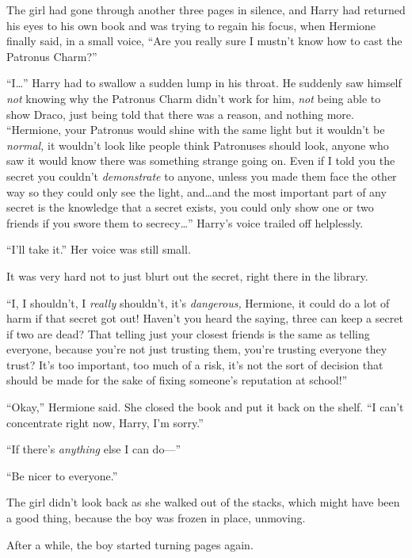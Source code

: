 The girl had gone through another three pages in silence, and Harry had returned his eyes to his own book and was trying to regain his focus, when Hermione finally said, in a small voice, “Are you really sure I mustn’t know how to cast the Patronus Charm?”

“I…” Harry had to swallow a sudden lump in his throat. He suddenly saw himself \emph{not} knowing why the Patronus Charm didn’t work for him, \emph{not} being able to show Draco, just being told that there was a reason, and nothing more. “Hermione, your Patronus would shine with the same light but it wouldn’t be \emph{normal,} it wouldn’t look like people think Patronuses should look, anyone who saw it would know there was something strange going on. Even if I told you the secret you couldn’t \emph{demonstrate} to anyone, unless you made them face the other way so they could only see the light, and…and the most important part of any secret is the knowledge that a secret exists, you could only show one or two friends if you swore them to secrecy…” Harry’s voice trailed off helplessly.

“I’ll take it.” Her voice was still small.

It was very hard not to just blurt out the secret, right there in the library.

“I, I shouldn’t, I \emph{really} shouldn’t, it’s \emph{dangerous,} Hermione, it could do a lot of harm if that secret got out! Haven’t you heard the saying, three can keep a secret if two are dead? That telling just your closest friends is the same as telling everyone, because you’re not just trusting them, you’re trusting everyone they trust? It’s too important, too much of a risk, it’s not the sort of decision that should be made for the sake of fixing someone’s reputation at school!”

“Okay,” Hermione said. She closed the book and put it back on the shelf. “I can’t concentrate right now, Harry, I’m sorry.”

“If there’s \emph{anything} else I can do—”

“Be nicer to everyone.”

The girl didn’t look back as she walked out of the stacks, which might have been a good thing, because the boy was frozen in place, unmoving.

After a while, the boy started turning pages again.
